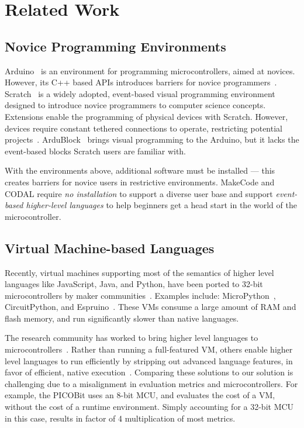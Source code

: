 \section{Related Work}
\label{sec:related}
\subsection{Novice Programming Environments}

Arduino~\cite{buildingArduino2014} is an environment for programming microcontrollers, aimed at novices. However, its C++ based APIs introduces barriers for novice programmers~\cite{blikstein2013gears}. Scratch~\cite{ScratchCACM2009} is a widely adopted, event-based visual programming environment designed to introduce novice programmers to computer science concepts. Extensions enable the programming of physical devices with Scratch. However, devices require constant tethered connections to operate, restricting potential projects~\cite{dougherty2012maker}. ArduBlock~\cite{Ardubloc28:online} brings visual programming to the Arduino, but it lacks the event-based blocks Scratch users are familiar with.

With the environments above, additional software must be installed --- this creates barriers for novice users in restrictive environments. MakeCode and CODAL require \emph{no installation} to support a diverse user base and support \emph{event-based higher-level languages} to help beginners get a head start in the world of the microcontroller.

\subsection{Virtual Machine-based Languages}

Recently, virtual machines supporting most of the semantics of higher level languages like JavaScript, Java, and Python, have been ported to 32-bit microcontrollers by maker communities~\cite{dougherty2012maker}. Examples include: MicroPython~\cite{MicroPython}, CircuitPython, and Espruino~\cite{espruinoBook}. These VMs consume a large amount of RAM and flash memory, and run significantly slower than native languages.

The research community has worked to bring higher level languages to microcontrollers~\cite{koshy2005vmstar,st2009picobit,vaugon2015programming}. Rather than running a full-featured VM, others enable higher level languages to run efficiently by stripping out advanced language features, in favor of efficient, native execution~\cite{varma2004java}. Comparing these solutions to our solution is challenging due to a misalignment in evaluation metrics and microcontrollers. For example, the PICOBit uses an 8-bit MCU, and evaluates the cost of a VM, without the cost of a runtime environment. Simply accounting for a 32-bit MCU in this case, results in factor of 4 multiplication of most metrics.

